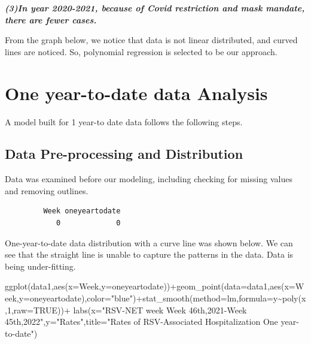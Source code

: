 \documentclass[
  letterpaper,
  DIV=11,
  numbers=noendperiod]{scrreport}
\newenvironment{Shaded}{\begin{snugshade}}{\end{snugshade}}
\newcommand{\AttributeTok}[1]{\textcolor[rgb]{0.40,0.45,0.13}{#1}}
\newcommand{\ConstantTok}[1]{\textcolor[rgb]{0.56,0.35,0.01}{#1}}
\newcommand{\DecValTok}[1]{\textcolor[rgb]{0.68,0.00,0.00}{#1}}
\newcommand{\FunctionTok}[1]{\textcolor[rgb]{0.28,0.35,0.67}{#1}}
\newcommand{\NormalTok}[1]{\textcolor[rgb]{0.00,0.23,0.31}{#1}}
\newcommand{\SpecialCharTok}[1]{\textcolor[rgb]{0.37,0.37,0.37}{#1}}
\newcommand{\StringTok}[1]{\textcolor[rgb]{0.13,0.47,0.30}{#1}}
\begin{document}
\textbf{\emph{(3)In year 2020-2021, because of Covid restriction and
mask mandate, there are fewer cases.}}

From the graph below, we notice that data is not linear distributed, and
curved lines are noticed. So, polynomial regression is selected to be
our approach.

\hypertarget{one-year-to-date-data-analysis}{%
\section{One year-to-date data
Analysis}\label{one-year-to-date-data-analysis}}

A model built for 1 year-to date data follows the following steps.

\hypertarget{data-pre-processing-and-distribution}{%
\subsection{Data Pre-processing and
Distribution}\label{data-pre-processing-and-distribution}}

Data was examined before our modeling, including checking for missing
values and removing outlines.

\begin{verbatim}
         Week oneyeartodate 
            0             0 
\end{verbatim}

One-year-to-date data distribution with a curve line was shown below. We
can see that the straight line is unable to capture the patterns in the
data. Data is being under-fitting.

\begin{Shaded}
\begin{Highlighting}[]
\FunctionTok{ggplot}\NormalTok{(data1,}\FunctionTok{aes}\NormalTok{(}\AttributeTok{x=}\NormalTok{Week,}\AttributeTok{y=}\NormalTok{oneyeartodate))}\SpecialCharTok{+}\FunctionTok{geom\_point}\NormalTok{(}\AttributeTok{data=}\NormalTok{data1,}\FunctionTok{aes}\NormalTok{(}\AttributeTok{x=}\NormalTok{Week,}\AttributeTok{y=}\NormalTok{oneyeartodate),}\AttributeTok{color=}\StringTok{"blue"}\NormalTok{)}\SpecialCharTok{+}\FunctionTok{stat\_smooth}\NormalTok{(}\AttributeTok{method=}\NormalTok{lm,}\AttributeTok{formula=}\NormalTok{y}\SpecialCharTok{\textasciitilde{}}\FunctionTok{poly}\NormalTok{(x,}\DecValTok{1}\NormalTok{,}\AttributeTok{raw=}\ConstantTok{TRUE}\NormalTok{))}\SpecialCharTok{+}
  \FunctionTok{labs}\NormalTok{(}\AttributeTok{x=}\StringTok{"RSV{-}NET week Week 46th,2021{-}Week 45th,2022"}\NormalTok{,}\AttributeTok{y=}\StringTok{"Rates"}\NormalTok{,}\AttributeTok{title=}\StringTok{"Rates of RSV{-}Associated Hospitalization One year{-}to{-}date"}\NormalTok{)}
\end{Highlighting}
\end{Shaded}
\end{document}
